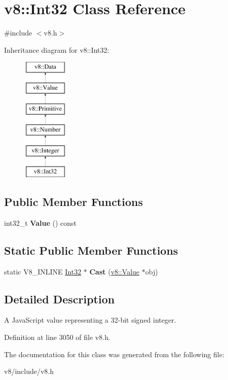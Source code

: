 \hypertarget{classv8_1_1Int32}{}\section{v8\+:\+:Int32 Class Reference}
\label{classv8_1_1Int32}


{\ttfamily \#include $<$v8.\+h$>$}

Inheritance diagram for v8\+:\+:Int32\+:\begin{figure}[H]
\begin{center}
\leavevmode
\includegraphics[height=6.000000cm]{classv8_1_1Int32}
\end{center}
\end{figure}
\subsection*{Public Member Functions}
\begin{DoxyCompactItemize}
\item 
\mbox{\label{classv8_1_1Int32_abc5db5bf900563b174ee8e829d3431c4}} 
int32\+\_\+t {\bfseries Value} () const
\end{DoxyCompactItemize}
\subsection*{Static Public Member Functions}
\begin{DoxyCompactItemize}
\item 
\mbox{\label{classv8_1_1Int32_a910c59c30a7f5f3c96afd0ba10d5339b}} 
static V8\+\_\+\+I\+N\+L\+I\+NE \mbox{\hyperlink{classv8_1_1Int32}{Int32}} $\ast$ {\bfseries Cast} (\mbox{\hyperlink{classv8_1_1Value}{v8\+::\+Value}} $\ast$obj)
\end{DoxyCompactItemize}


\subsection{Detailed Description}
A Java\+Script value representing a 32-\/bit signed integer. 

Definition at line 3050 of file v8.\+h.



The documentation for this class was generated from the following file\+:\begin{DoxyCompactItemize}
\item 
v8/include/v8.\+h\end{DoxyCompactItemize}
